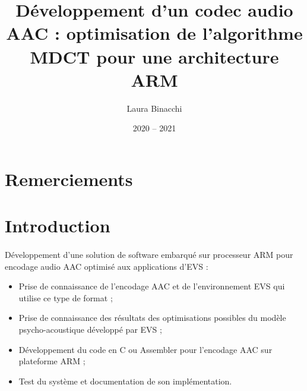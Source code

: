 \documentclass{article}
\title{Développement d'un codec audio AAC : optimisation de l'algorithme MDCT pour une architecture ARM}
\date{2020 -- 2021}
\author{Laura Binacchi}
\begin{document}
    
    \newpage
    \tableofcontents
    \newpage
    \listoffigures

    \newpage
    \section*{Remerciements}

    \newpage
    \section*{Introduction}


    \paragraph{}
    Développement d'une solution de software embarqué sur processeur ARM pour encodage audio AAC optimisé aux applications d'EVS :
    \begin{itemize}
        \item Prise de connaissance de l'encodage AAC et de l'environnement EVS qui utilise ce type de format ;
        \item Prise de connaissance des résultats des optimisations possibles du modèle psycho-acoustique développé par EVS ;
        \item Développement du code en C ou Assembler pour l'encodage AAC sur plateforme ARM ;
        \item Test du système et documentation de son implémentation.
    \end{itemize}

    \paragraph{}
\end{document}
